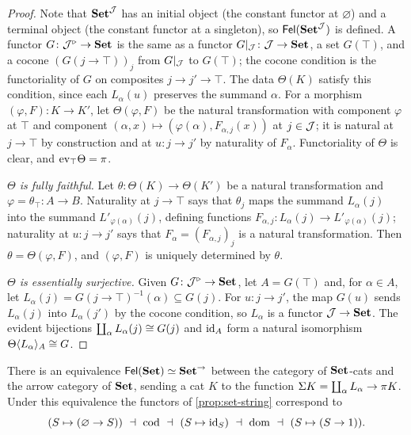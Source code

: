 \begin{proof}
Note that $\mathbf{Set}^{\mathcal{J}}$ has an initial object (the constant functor at
$\varnothing$) and a terminal object (the constant functor at a singleton),
so $\mathsf{Fel}(\mathbf{Set}^{\mathcal{J}})$ is defined. A functor $G\colon\mathcal{J}^{\triangleright}\to\mathbf{Set}$ is
the same as a functor $G|_{\mathcal{J}}\colon\mathcal{J}\to\mathbf{Set}$, a set $G(\top)$, and a cocone
$(G(j\to\top))_j$ from $G|_{\mathcal{J}}$ to $G(\top)$; the cocone condition is the
functoriality of $G$ on composites $j\to j'\to\top$. The data $\Theta(K)$ satisfy
this condition, since each $L_\alpha(u)$ preserves the summand $\alpha$. For a
morphism $(\varphi,F)\colon K\to K'$, let $\Theta(\varphi,F)$ be the natural
transformation with component $\varphi$ at $\top$ and component
$(\alpha,x)\mapsto(\varphi(\alpha),F_{\alpha,j}(x))$ at $j\in\mathcal{J}$; it is natural at
$j\to\top$ by construction and at $u\colon j\to j'$ by naturality of
$F_\alpha$. Functoriality of $\Theta$ is clear, and $\mathrm{ev}_\top\Theta=\pi$.

\emph{$\Theta$ is fully faithful.} Let $\theta\colon\Theta(K)\to\Theta(K')$ be a
natural transformation and $\varphi=\theta_\top\colon A\to B$. Naturality at
$j\to\top$ says that $\theta_j$ maps the summand $L_\alpha(j)$ into the summand
$L'_{\varphi(\alpha)}(j)$, defining functions
$F_{\alpha,j}\colon L_\alpha(j)\to L'_{\varphi(\alpha)}(j)$; naturality at
$u\colon j\to j'$ says that $F_\alpha=(F_{\alpha,j})_j$ is a natural transformation.
Then $\theta=\Theta(\varphi,F)$, and $(\varphi,F)$ is uniquely determined by
$\theta$.

\emph{$\Theta$ is essentially surjective.} Given $G\colon\mathcal{J}^{\triangleright}\to\mathbf{Set}$,
let $A=G(\top)$ and, for $\alpha\in A$, let $L_\alpha(j)=G(j\to\top)^{-1}(\alpha)\subseteq G(j)$.
For $u\colon j\to j'$, the map $G(u)$ sends $L_\alpha(j)$ into $L_\alpha(j')$ by
the cocone condition, so $L_\alpha$ is a functor $\mathcal{J}\to\mathbf{Set}$. The evident
bijections $\coprod_\alpha L_\alpha(j)\cong G(j)$ and $\mathrm{id}_A$ form a natural
isomorphism $\Theta\langle L_\alpha\rangle_A\cong G$.
\end{proof}

\begin{corollary}\label{cor:Fel-Set}
There is an equivalence $\mathsf{Fel}(\mathbf{Set})\simeq\mathbf{Set}^{\to}$ between the category of
$\mathbf{Set}$-cats and the arrow category of $\mathbf{Set}$, sending a cat $K$ to the function
$\Sigma K=\coprod_\alpha L_\alpha\to\pi K$. Under this equivalence the
functors of \cref{prop:set-string} correspond to
\[
(S\mapsto(\varnothing\to S))\ \dashv\ \mathrm{cod}\ \dashv\ (S\mapsto\id_S)\ \dashv\ \mathrm{dom}\ \dashv\ (S\mapsto(S\to1)).
\]
\end{corollary}


